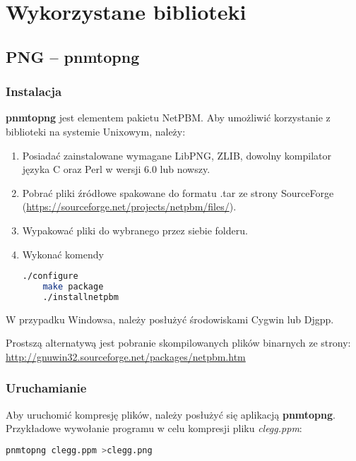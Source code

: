 \section{Wykorzystane biblioteki}

\subsection{PNG -- pnmtopng}

\subsubsection{Instalacja}

\textbf{pnmtopng} jest elementem pakietu NetPBM. Aby umożliwić korzystanie z biblioteki na systemie Unixowym, należy:

\begin{enumerate}
	\item Posiadać zainstalowane wymagane LibPNG, ZLIB, dowolny kompilator języka C oraz Perl w wersji 6.0 lub nowszy.
	\item Pobrać pliki źródłowe spakowane do formatu .tar ze strony SourceForge (\url{https://sourceforge.net/projects/netpbm/files/}).
	
	\item Wypakować pliki do wybranego przez siebie folderu.
	
	\item Wykonać komendy
	\begin{lstlisting}[language=bash]
	./configure
	make package
	./installnetpbm
	\end{lstlisting}
\end{enumerate}

W przypadku Windowsa, należy posłużyć środowiskami Cygwin lub Djgpp.

Prostszą alternatywą jest pobranie skompilowanych plików binarnych ze strony: \url{http://gnuwin32.sourceforge.net/packages/netpbm.htm}

\subsubsection{Uruchamianie}

Aby uruchomić kompresję plików, należy posłużyć się aplikacją \textbf{pnmtopng}. Przykładowe wywołanie programu w celu kompresji pliku \textit{clegg.pp\textsl{}m}:

\begin{lstlisting}[language=bash]
	pnmtopng clegg.ppm >clegg.png
\end{lstlisting}

